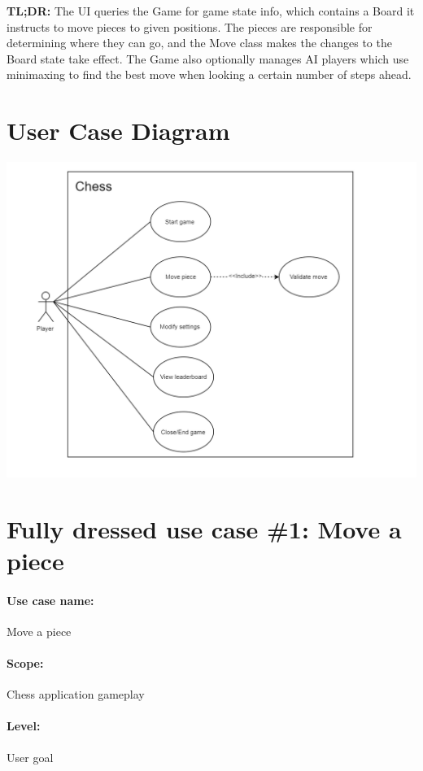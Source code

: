 \documentclass{article}
\begin{document}
\noindent
\textbf{TL;DR:} The UI queries the Game for game state info, which contains a Board it instructs to move pieces to given positions. The pieces are responsible for determining where they can go, and the Move class makes the changes to the Board state take effect. The Game also optionally manages AI players which use minimaxing to find the best move when looking a certain number of steps ahead.

\section*{User Case Diagram}
\includegraphics[width=15cm]{usecasediagram}

\section*{Fully dressed use case \#1: Move a piece}

\paragraph{Use case name:} Move a piece

\paragraph{Scope:} Chess application gameplay

\paragraph{Level:} User goal
\end{document}
